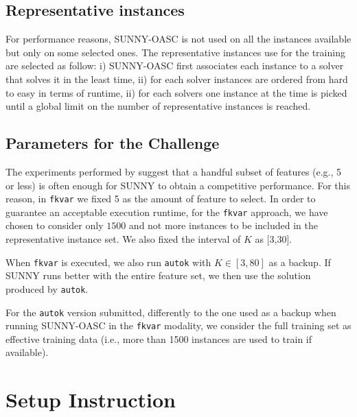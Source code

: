 \documentclass[tablecaption=bottom,wcp]{jmlr} %
\newcommand{\TODO}[1]{\textcolor{red}{#1}}
\begin{document}
\subsection{Representative instances}
For performance reasons, SUNNY-OASC is not used on all the instances available 
but only on some selected ones.
The representative instances use for the training are selected as follow: i) 
SUNNY-OASC first associates each instance to a solver that solves it in the 
least time, ii) for each solver instances are ordered from hard to easy in terms 
of runtime, ii) for each solvers one instance at the time is picked until a 
global limit on the number of representative instances is reached.

\subsection{Parameters for the Challenge}
The experiments performed by \cite{ictai_paper} suggest that a handful subset 
of features (e.g., 5 or less) is often enough for SUNNY to obtain a 
competitive performance. For this reason, in \texttt{fkvar} we fixed 
5 as the amount of feature to select. In order to guarantee an acceptable 
execution runtime, for the \texttt{fkvar} approach, we have chosen to 
consider only $1500$ and not more instances to be included in the 
representative instance set. We also fixed the interval of $K$ as [3,30]. 


When \texttt{fkvar} is executed, we also run 
\texttt{autok} with $K \in [3,80]$ as a backup. If SUNNY runs better with the 
entire feature set, we then use the solution produced by \texttt{autok}.

For the \texttt{autok} version submitted, differently to the one used as a 
backup when running SUNNY-OASC in the \texttt{fkvar} modality, we consider the 
full training set as effective training data (i.e., more than 1500 
instances are used to train if available). 

\section{Setup Instruction}
\end{document}
